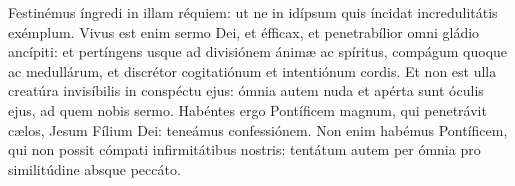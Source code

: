 Festinémus íngredi in illam réquiem:
	ut ne in idípsum quis íncidat incredulitátis exémplum.
Vivus est enim sermo Dei, et éfficax, et penetrabílior omni gládio ancípiti:
	et pertíngens usque ad divisiónem ánimæ ac spíritus,
	compágum quoque ac medullárum, et discrétor cogitatiónum et intentiónum cordis.
Et non est ulla creatúra invisíbilis in conspéctu ejus:
	ómnia autem nuda et apérta sunt óculis ejus, ad quem nobis sermo.
Habéntes ergo Pontíficem magnum, qui penetrávit cælos, Jesum Fílium Dei:
	teneámus confessiónem.
Non enim habémus Pontíficem, qui non possit cómpati infirmitátibus nostris:
	tentátum autem per ómnia pro similitúdine absque peccáto.
